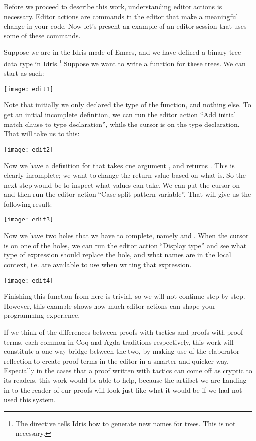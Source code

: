 Before we proceed to describe this work, understanding editor actions is
necessary. Editor actions are commands in the editor that make a meaningful
change in your code. Now let's present an example of an editor session that
uses some of these commands.

Suppose we are in the Idris mode of Emacs, and we have defined a
binary tree data type in Idris.\footnote{The  directive tells Idris
how to generate new names for trees. This is not necessary.} Suppose we want to write a 
function for these trees. We can start as such:

\vspace{1em}
\texttt{[image: edit1]}

Note that initially we only declared the type of the function, and nothing else. To get an initial incomplete definition, we can run the editor action ``Add initial match clause to type declaration'', while the cursor is on the type declaration. That will take us to this:

\vspace{1em}
\texttt{[image: edit2]}

Now we have a definition for  that takes one argument , and
returns . This is clearly incomplete; we want to change
the return value based on what  is. So the next step would be to inspect
what values  can take. We can put the cursor on  and then run the
editor action ``Case split pattern variable''. That will give us the following result:

\vspace{1em}
\texttt{[image: edit3]}

Now we have two holes that we have to complete, namely  and
. When the cursor is on one of the holes, we can run the editor action ``Display type'' and see what type of expression should replace the hole, and what names are in the local context, i.e. are available to use when writing that expression.

\vspace{1em}
\texttt{[image: edit4]}

Finishing this function from here is trivial, so we will not continue step by step. However, this example shows how much editor actions can shape your programming experience.



If we think of the differences between proofs with tactics and proofs with
proof terms, each common in Coq and Agda traditions respectively,
this work will constitute a one way bridge between the two, by
making use of the elaborator reflection to create proof terms in the editor in
a smarter and quicker way. Especially in the cases that a proof written with
tactics can come off as cryptic to its readers, this work would be able to
help, because the artifact we are handing in to the reader of our proofs
will look just like what it would be if we had not used this system.

